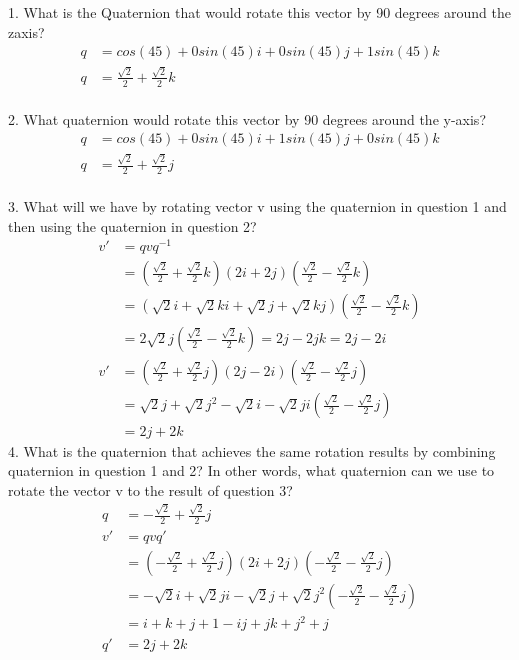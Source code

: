 \documentclass[12pt,letterpaper]{article}
\begin{document}
1. What is the Quaternion that would rotate this vector by 90 degrees around the zaxis?
\\
$$
     \begin{aligned}
         q & = cos(45) + 0sin(45)i + 0sin(45)j + 1sin(45)k
         \\
         q & = \frac{\sqrt{2}}{2} + \frac{\sqrt{2}}{2}k
         \\
     \end{aligned}
$$

2. What quaternion would rotate this vector by 90 degrees around the y-axis?
\\
$$
    \begin{aligned}
        q & = cos(45) + 0sin(45)i + 1sin(45)j + 0sin(45)k
        \\
        q & = \frac{\sqrt{2}}{2} + \frac{\sqrt{2}}{2}j
        \\
    \end{aligned}
$$

3. What will we have by rotating vector v using the quaternion in question 1 and then using the quaternion in question 2?
$$
    \begin{aligned}
        v' & = qvq^{-1}
        \\
        & = (\frac{\sqrt{2}}{2} + \frac{\sqrt{2}}{2}k)(2i + 2j)(\frac{\sqrt{2}}{2} - \frac{\sqrt{2}}{2}k)
        \\
        & = (\sqrt{2}i + \sqrt{2}ki + \sqrt{2}j + \sqrt{2}kj)(\frac{\sqrt{2}}{2} - \frac{\sqrt{2}}{2}k)
        \\
        & = 2\sqrt{2}j(\frac{\sqrt{2}}{2} - \frac{\sqrt{2}}{2}k) = 2j - 2jk = 2j -2i
        \\
        v' & = (\frac{\sqrt{2}}{2} + \frac{\sqrt{2}}{2}j)(2j - 2i)(\frac{\sqrt{2}}{2} - \frac{\sqrt{2}}{2}j)
        \\
        & = \sqrt{2}j + \sqrt{2}j^{2} - \sqrt{2}i - \sqrt{2}ji(\frac{\sqrt{2}}{2} - \frac{\sqrt{2}}{2}j)
        \\
        & = 2j + 2k
    \end{aligned}
$$
4. What is the quaternion that achieves the same rotation results by combining quaternion in question 1 and 2? In other words, what quaternion can we use to rotate the vector v to the result of question 3?
$$
    \begin{aligned}
        q & = -\frac{\sqrt{2}}{2} + \frac{\sqrt{2}}{2}j
        \\
        v' & = qvq'
        \\
        & = (-\frac{\sqrt{2}}{2} + \frac{\sqrt{2}}{2}j)(2i + 2j)(-\frac{\sqrt{2}}{2} - \frac{\sqrt{2}}{2}j)
        \\
        & = -\sqrt{2}i + \sqrt{2}ji - \sqrt{2}j + \sqrt{2}j^{2}(-\frac{\sqrt{2}}{2} - \frac{\sqrt{2}}{2}j)
        \\
        & = i + k + j + 1 - ij + jk + j^{2} + j
        \\
        q' & = 2j + 2k
    \end{aligned}
$$
\end{document}
